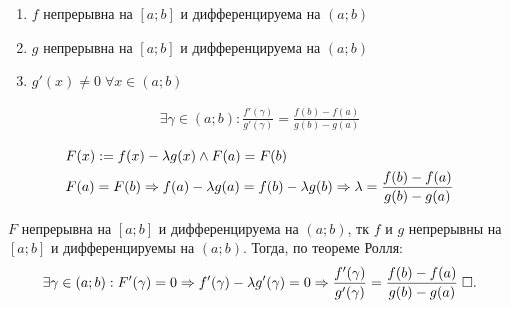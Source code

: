 \documentclass{article}
\begin{document}

\theorem

\begin{enumerate}
	\item$f$ непрерывна на $[a;b]$ и дифференцируема на $(a;b)$
	\item$g$ непрерывна на $[a;b]$ и дифференцируема на $(a;b)$
	\item$g'(x)\neq0\;\forall x\in (a;b)$
\end{enumerate}
\begin{align*}
	\exists \gamma\in(a;b):\frac{f'(\gamma)}{g'(\gamma)}=\frac{f(b)-f(a)}{g(b)-g(a)}
\end{align*}

\proof
\begin{align*}
	 & F(x):=f(x)-\lambda g(x) \land F(a)=F(b)             \\
	 & F(a)=F(b) \Rightarrow f(a)-\lambda g(a)=f(b)-\lambda g(b)
	\Rightarrow\lambda=\frac{f(b)-f(a)}{g(b)-g(a)}
\end{align*}

$F$ непрерывна на $[a;b]$ и дифференцируема на $(a;b)$, тк $f$ и $g$ непрерывны на $[a;b]$ и дифференцируемы на $(a;b)$. Тогда, по теореме Ролля:
\begin{align*}
	\exists\gamma\in(a;b):F'(\gamma)=0 \Rightarrow f'(\gamma)-\lambda g'(\gamma)=0
	\Rightarrow \frac{f'(\gamma)}{g'(\gamma)}=\frac{f(b)-f(a)}{g(b)-g(a)}\;\square.
\end{align*}
\end{document}
